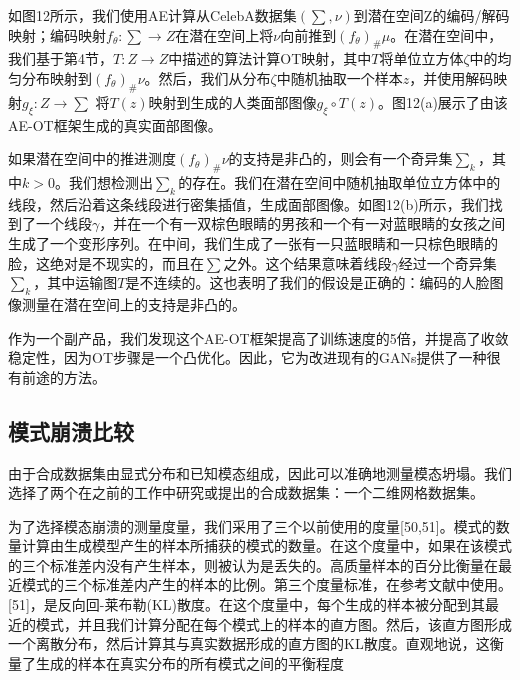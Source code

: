 如图12所示，我们使用AE计算从CelebA数据集$(\sum,\nu)$到潜在空间Z的编码/解码映射；编码映射$f_{\theta}: \sum \to Z$在潜在空间上将$\nu$向前推到$(f_{\theta})_{\#}\mu$。在潜在空间中，我们基于第4节，$T: Z\to Z$中描述的算法计算OT映射，其中$T$将单位立方体$\zeta$中的均匀分布映射到$(f_{\theta})_{\#}\nu$。然后，我们从分布$\zeta$中随机抽取一个样本$z$，并使用解码映射$g_{\xi}:Z\to \sum$ 将$T(z)$映射到生成的人类面部图像$g_{\xi} \circ T(z)$。图12(a)展示了由该AE-OT框架生成的真实面部图像。

如果潜在空间中的推进测度$(f_{\theta})_{\#} \nu$的支持是非凸的，则会有一个奇异集$\sum _k$，其中$k>0$。我们想检测出$\sum _k$的存在。我们在潜在空间中随机抽取单位立方体中的线段，然后沿着这条线段进行密集插值，生成面部图像。如图12(b)所示，我们找到了一个线段$\gamma$，并在一个有一双棕色眼睛的男孩和一个有一对蓝眼睛的女孩之间生成了一个变形序列。在中间，我们生成了一张有一只蓝眼睛和一只棕色眼睛的脸，这绝对是不现实的，而且在$\sum$之外。这个结果意味着线段$\gamma$经过一个奇异集$\sum _k$，其中运输图$T$是不连续的。这也表明了我们的假设是正确的：编码的人脸图像测量在潜在空间上的支持是非凸的。

作为一个副产品，我们发现这个AE-OT框架提高了训练速度的5倍，并提高了收敛稳定性，因为OT步骤是一个凸优化。因此，它为改进现有的GANs提供了一种很有前途的方法。

\subsection{模式崩溃比较}

由于合成数据集由显式分布和已知模态组成，因此可以准确地测量模态坍塌。我们选择了两个在之前的工作中研究或提出的合成数据集：一个二维网格数据集。

为了选择模态崩溃的测量度量，我们采用了三个以前使用的度量[50,51]。模式的数量计算由生成模型产生的样本所捕获的模式的数量。在这个度量中，如果在该模式的三个标准差内没有产生样本，则被认为是丢失的。高质量样本的百分比衡量在最近模式的三个标准差内产生的样本的比例。第三个度量标准，在参考文献中使用。[51]，是反向回-莱布勒(KL)散度。在这个度量中，每个生成的样本被分配到其最近的模式，并且我们计算分配在每个模式上的样本的直方图。然后，该直方图形成一个离散分布，然后计算其与真实数据形成的直方图的KL散度。直观地说，这衡量了生成的样本在真实分布的所有模式之间的平衡程度

